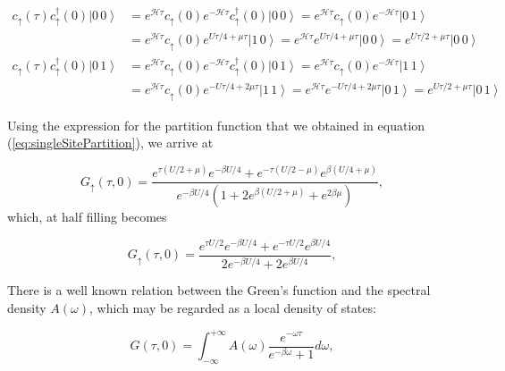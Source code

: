 \begin{equation}
\begin{split}
c_{\uparrow} ( \tau) c_{\uparrow}^\dagger ( 0 )  \left| 0\, 0 \right\rangle &= e^{\mathcal{H} \tau } c_{\uparrow} ( 0 ) e^{-\mathcal{H} \tau } c_{\uparrow}^\dagger ( 0 )  \left| 0\, 0 \right\rangle = e^{\mathcal{H} \tau } c_{\uparrow} ( 0 ) e^{-\mathcal{H} \tau } \left| 0\, 1 \right\rangle \\
 &= e^{\mathcal{H} \tau } c_{\uparrow} ( 0 ) e^{U \tau / 4 + \mu \tau } \left| 1\, 0 \right\rangle = e^{\mathcal{H} \tau } e^{U \tau / 4 + \mu \tau } \left| 0\, 0 \right\rangle = e^{U \tau / 2 + \mu \tau } \left| 0\, 0 \right\rangle \\
 c_{\uparrow} ( \tau) c_{\uparrow}^\dagger ( 0 )  \left| 0\, 1 \right\rangle &= e^{\mathcal{H} \tau } c_{\uparrow} ( 0 ) e^{-\mathcal{H} \tau } c_{\uparrow}^\dagger ( 0 )  \left| 0\, 1 \right\rangle = e^{\mathcal{H} \tau } c_{\uparrow} ( 0 ) e^{-\mathcal{H} \tau } \left| 1\, 1 \right\rangle \\
 &= e^{\mathcal{H} \tau } c_{\uparrow} ( 0 ) e^{- U \tau / 4 + 2 \mu \tau } \left| 1\, 1 \right\rangle = e^{\mathcal{H} \tau } e^{- U \tau / 4 + 2 \mu \tau } \left| 0\, 1 \right\rangle = e^{U \tau / 2 + \mu \tau } \left| 0\, 1 \right\rangle
\end{split}
\end{equation}

Using the expression for the partition function that we obtained in equation (\ref{eq:singleSitePartition}), we arrive at

\begin{equation}
G_\uparrow (\tau, 0) = \frac{ e^{\tau ( U / 2 + \mu )} e^{-\beta U / 4} + e^{-\tau ( U / 2 - \mu )} e^{\beta (U / 4 + \mu)} }{ e^{-\beta U / 4} ( 1 + 2 e^{\beta ( U /2 + \mu)} + e^{2\beta \mu} ) } ,
\end{equation}
which, at half filling becomes

\begin{equation}
G_\uparrow (\tau, 0) = \frac{ e^{\tau U / 2} e^{-\beta U / 4} + e^{-\tau U / 2} e^{\beta U / 4 } }{ 2 e^{-\beta U / 4}  + 2 e^{\beta U / 4} } ,
\end{equation}

There is a well known relation between the Green's function and the spectral density $A ( \omega )$, which may be regarded as a local density of states:

\begin{equation}\label{eq:specDens}
G ( \tau, 0 ) =  \int_{-\infty}^{+\infty} A ( \omega ) \frac{e^{-\omega \tau} }{ e^{-\beta \omega} + 1 } d\omega ,
\end{equation}

